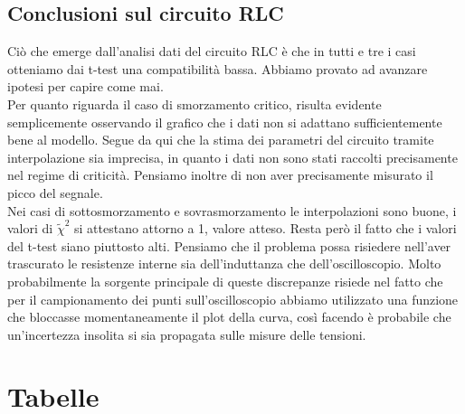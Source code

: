\documentclass[letterpaper,12pt]{article}
\begin{document}
\subsection{Conclusioni sul circuito RLC}
Ciò che emerge dall'analisi dati del circuito RLC è che in tutti e tre i casi otteniamo dai t-test una compatibilità bassa. Abbiamo provato ad avanzare ipotesi per capire come mai. \\
Per quanto riguarda il caso di smorzamento critico, risulta evidente semplicemente osservando il grafico che i dati non si adattano sufficientemente bene al modello. Segue da qui che la stima dei parametri del circuito tramite interpolazione sia imprecisa, in quanto i dati non sono stati raccolti precisamente nel regime di criticità. Pensiamo inoltre di non aver precisamente misurato il picco del segnale. \\
Nei casi di sottosmorzamento e sovrasmorzamento le interpolazioni sono buone, i valori di $\widetilde{\chi}^2$ si attestano attorno a 1, valore atteso. Resta però il fatto che i valori del t-test siano piuttosto alti. Pensiamo che il problema possa risiedere nell'aver trascurato le resistenze interne sia dell'induttanza che dell'oscilloscopio. Molto probabilmente la sorgente principale di queste discrepanze risiede nel fatto che per il campionamento dei punti sull'oscilloscopio abbiamo utilizzato una funzione che bloccasse momentaneamente il plot della curva, così facendo è probabile che un'incertezza insolita si sia propagata sulle misure delle tensioni.  
\newpage
\section{Tabelle}
\end{document}
